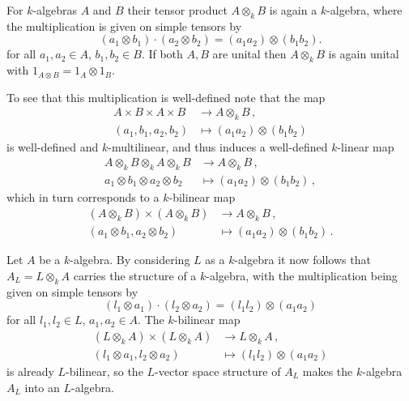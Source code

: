 \begin{fluff}
  For $k$-algebras $A$ and $B$ their tensor product $A \otimes_k B$ is again a $k$-algebra, where the multiplication is given on simple tensors by
  \[
      (a_1 \otimes b_1) \cdot (a_2 \otimes b_2)
    = (a_1 a_2) \otimes (b_1 b_2).
  \]
  for all $a_1, a_2 \in A$, $b_1, b_2 \in B$.
  If both $A, B$ are unital then $A \otimes_k B$ is again unital with $1_{A \otimes B} = 1_A \otimes 1_B$.
  
  To see that this multiplication is well-defined note that the map
  \begin{align*}
              A \times B \times A \times B
    &\to      A \otimes_k B \,, \\
              (a_1, b_1, a_2, b_2)
    &\mapsto  (a_1 a_2) \otimes (b_1 b_2)
  \end{align*}
  is well-defined and $k$-multilinear, and thus induces a well-defined $k$-linear map
  \begin{align*}
              A \otimes_k B \otimes_k A \otimes_k B
    &\to      A \otimes_k B \,, \\
              a_1 \otimes b_1 \otimes a_2 \otimes b_2
    &\mapsto  (a_1 a_2) \otimes (b_1 b_2) \,,
  \end{align*}
  which in turn corresponds to a $k$-bilinear map
  \begin{align*}
              (A \otimes_k B) \times (A \otimes_k B)
    &\to      A \otimes_k B \,, \\
              (a_1 \otimes b_1, a_2 \otimes b_2)
    &\mapsto  (a_1 a_2) \otimes (b_1 b_2) \,.
  \end{align*}
\end{fluff}

\begin{fluff}
  Let $A$ be a $k$-algebra.
  By considering $L$ as a $k$-algebra it now follows that $A_L = L \otimes_k A$ carries the structure of a $k$-algebra, with the multiplication being given on simple tensors by
  \[
      (l_1 \otimes a_1) \cdot (l_2 \otimes a_2)
    = (l_1 l_2) \otimes (a_1 a_2)
  \]
  for all $l_1, l_2 \in L$, $a_1, a_2 \in A$.
  The $k$-bilinear map
  \begin{align*}
              (L\otimes_k A) \times (L \otimes_k A)
    &\to      L \otimes_k A \,, \\
              (l_1 \otimes a_1, l_2 \otimes a_2)
    &\mapsto  (l_1 l_2) \otimes (a_1 a_2)
  \end{align*}
  is already $L$-bilinear, so the $L$-vector space structure of $A_L$ makes the $k$-algebra $A_L$ into an $L$-algebra.
\end{fluff}


